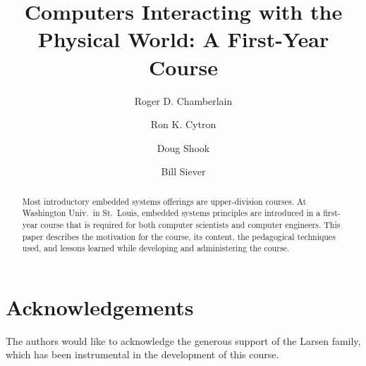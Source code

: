 \documentclass[runningheads]{llncs}
\begin{document}
%
\title{Computers Interacting with the Physical World: A First-Year Course}
%
%
\author{Roger D. Chamberlain%
\and
Ron K. Cytron%
\and
Doug Shook%
\and
Bill Siever%
}
%
%
%

\maketitle              %
%
\begin{abstract}
Most introductory embedded systems offerings are upper-division courses.
At Washington Univ.~in St.~Louis,
embedded systems principles are introduced in a first-year course that
is required for both computer scientists and computer engineers.
This paper describes the motivation for the course, its content,
the pedagogical techniques used, and lessons learned while developing
and administering the course.

\end{abstract}
%
%
%








\section*{Acknowledgements}
The authors would like to acknowledge
the generous support of the Larsen family, which has been instrumental
in the development of this course.


%
%
%


%
\end{document}
